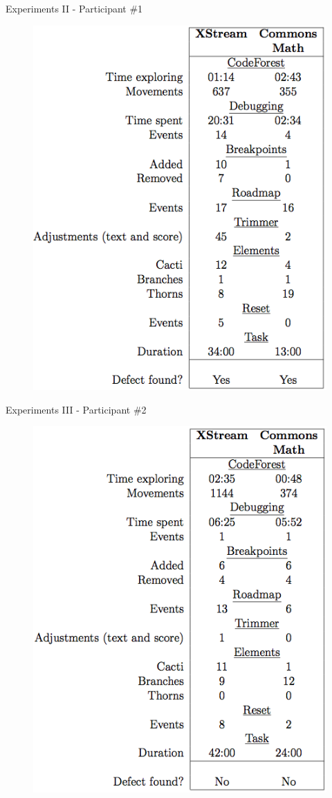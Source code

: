 \documentclass[handout]{beamer}
\begin{document}
\begin{frame}{Experiments II - Participant \#1}
        \begin{figure}
            \includegraphics[width=.5\textwidth]{figures/pilot_experiment}
        \end{figure}
\end{frame}

\begin{frame}{Experiments III - Participant \#2}
        \begin{figure}
            \includegraphics[width=.5\textwidth]{figures/experiment_1}
        \end{figure}
\end{frame}
\end{document}
